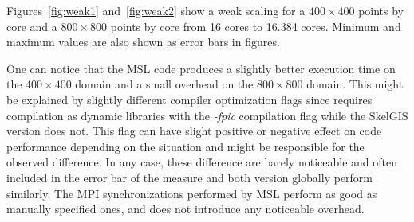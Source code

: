 Figures~\ref{fig:weak1} and~\ref{fig:weak2} show a weak scaling for a $400 \times 400$ points by core and a $800 \times 800$ points by core from 16 cores to 16.384 cores.
Minimum and maximum values are also shown as error bars in figures.

One can notice that the MSL code produces a slightly better execution time on the $400 \times 400$ domain and a small overhead on the $800 \times 800$ domain.
This might be explained by slightly different compiler optimization flags since \llc requires compilation as dynamic libraries with the \emph{-fpic} compilation flag while the SkelGIS version does not.
This flag can have slight positive or negative effect on code performance depending on the situation and might be responsible for the observed difference.
In any case, these difference are barely noticeable and often included in the error bar of the measure and both version globally perform similarly.
The MPI synchronizations performed by MSL perform as good as manually specified ones, and \llc does not introduce any noticeable overhead.

